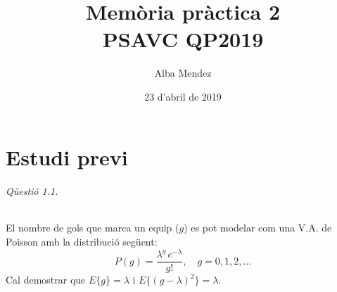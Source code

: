 \documentclass[catalan]{scrartcl}
\author{Alba Mendez}
\title{Memòria pràctica 2\\
{\small PSAVC QP2019}}
\date{23 d'abril de 2019}
\begin{document}
\maketitle


\part{Estudi previ}

\paragraph{Qüestió 1.1.}

El nombre de gols que marca un equip ($g$) es pot modelar com una V.A. de
Poisson amb la distribució següent:
%
\begin{equation}
  P(g) = \frac{\lambda^g \, e^{-\lambda} }{g!}, \quad g = 0,1,2,\hdots
\end{equation}
%
Cal demostrar que $E\{g\} = \lambda$ i $E\{(g - \lambda)^2\} = \lambda$.
\end{document}
